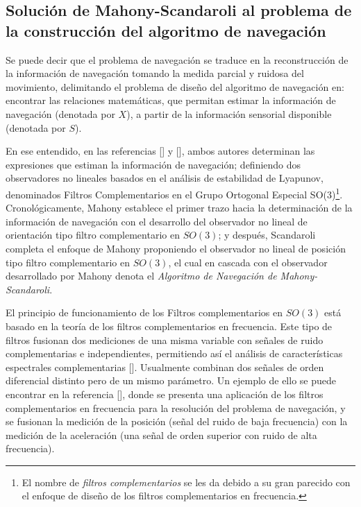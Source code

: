 \documentclass[10pt]{report}
\numberwithin{equation}{chapter}
\numberwithin{algorithm}{chapter}
\newcommand{\bcite}[1]{[\cite{#1}]}
\begin{document}
\subsection{Solución de Mahony-Scandaroli al problema de la construcción del algoritmo de navegación}
Se puede decir que el problema de navegación se traduce en la reconstrucción de la información de navegación tomando la medida parcial y ruidosa del movimiento, delimitando el problema de diseño del algoritmo de navegación en: encontrar las relaciones matemáticas, que permitan estimar la información de navegación (denotada por $X$), a partir de la información sensorial disponible (denotada por $S$).\par
En ese entendido, en las referencias \bcite{Mahony2008} y \bcite{Scandaro2011}, ambos autores determinan las expresiones que estiman la información de navegación; definiendo dos observadores no lineales basados en el análisis de estabilidad de Lyapunov, denominados Filtros Complementarios en el Grupo Ortogonal Especial SO(3)\footnote{El nombre de \emph{filtros complementarios} se les da debido a su gran parecido con el enfoque de diseño de los filtros complementarios en frecuencia.}. Cronológicamente, Mahony establece el primer trazo hacia la determinación de la información de navegación con el desarrollo del observador no lineal de orientación tipo filtro complementario en $SO(3)$; y después, Scandaroli completa el enfoque de Mahony proponiendo el observador no lineal de posición tipo filtro complementario en $SO(3)$, el cual en cascada con el observador desarrollado por Mahony denota el \emph{Algoritmo de Navegación de Mahony-Scandaroli}.\par
El principio de funcionamiento de los Filtros complementarios en $SO(3)$ está basado en la teoría de los filtros complementarios en frecuencia. Este tipo de filtros fusionan dos mediciones de una misma variable con señales de ruido complementarias e independientes, permitiendo así el análisis de características espectrales complementarias [\cite{Mahony2008}]. Usualmente combinan dos señales de orden diferencial distinto pero de un mismo parámetro. Un ejemplo de ello se puede encontrar en la referencia \bcite{Gaydou2008}, donde se presenta una aplicación de los filtros complementarios en frecuencia para la resolución del problema de navegación, y se fusionan la medición de la posición (señal del ruido de baja frecuencia) con la medición de la aceleración (una señal de orden superior con ruido de alta frecuencia).\par
\end{document}
